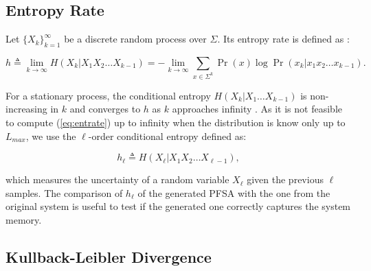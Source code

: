 {\subsection{Entropy Rate}

%

Let $\{X_k\}_{k=1}^{\infty}$ be a discrete random process over $\Sigma$. Its entropy rate is defined as \cite{cover2012elements}:

\begin{equation}
h \triangleq \lim_{k\rightarrow\infty}H(X_k|X_1X_2\ldots X_{k-1}) = -\lim_{k\rightarrow\infty}\sum_{x\in \Sigma^k}\Pr(x)\log \Pr(x_k|x_1x_2\ldots x_{k-1}).  \label{eq:entrate}
\end{equation}

\noindent For a stationary process, the conditional entropy $H(X_k|X_1\ldots X_{k-1})$ is non-increasing in $k$ and converges to $h$ as $k$ approaches infinity \citep{cover2012elements}. As it is not feasible to compute (\ref{eq:entrate}) up to infinity when the distribution is know only up to $L_{max}$, we use the $\ell$-order conditional entropy defined as:

\begin{equation}
h_{\ell} \triangleq H(X_{\ell}|X_1X_2\ldots X_{\ell-1}),   \label{eq:entratel}
\end{equation}

\noindent which measures the uncertainty of a random variable $X_{\ell}$ given the previous $\ell$ samples.  The comparison of  $h_{\ell}$ of the generated PFSA with the one from the original system is useful to test if the generated one correctly captures the system memory.

\subsection{Kullback-Leibler Divergence}\label{sec:kld}

%

}
